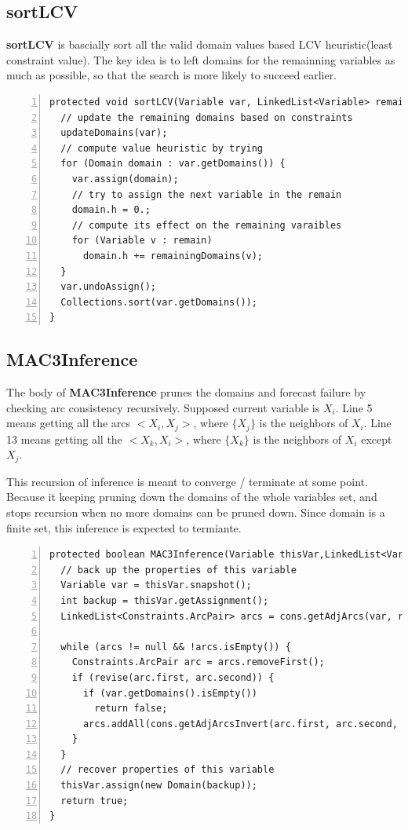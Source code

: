 \documentclass{article}
\begin{document}
\subsection{sortLCV}

\textbf{sortLCV} is bascially sort all the valid domain values based LCV heuristic(least constraint value). The key idea is to left domains for the remainning variables as much as possible, so that the search is more likely to succeed earlier.

\begin{lstlisting}[numbers=left]   
protected void sortLCV(Variable var, LinkedList<Variable> remain) {
  // update the remaining domains based on constraints
  updateDomains(var);
  // compute value heuristic by trying
  for (Domain domain : var.getDomains()) {
    var.assign(domain);
    // try to assign the next variable in the remain
    domain.h = 0.;
    // compute its effect on the remaining varaibles
    for (Variable v : remain)
      domain.h += remainingDomains(v);
  }
  var.undoAssign();
  Collections.sort(var.getDomains());
}
\end{lstlisting}









\clearpage
\subsection{MAC3Inference}

The body of \textbf{MAC3Inference} prunes the domains and forecast failure by checking arc consistency recursively. Supposed current variable is $X_i$. Line 5 means getting all the arcs $<X_i, X_j>$, where $\{X_j\}$ is the neighbors of $X_i$. Line 13 means getting all the $<X_k, X_i>$, where $\{X_k\}$ is the neighbors of $X_i$ except $X_j$.

This recursion of inference is meant to converge / terminate at some point.  Because it keeping pruning down the domains of the whole variables set, and stops recursion when no more domains can be pruned down. Since domain is a finite set, this inference is expected to termiante.

\begin{lstlisting}[numbers=left]   
protected boolean MAC3Inference(Variable thisVar,LinkedList<Variable> remain){
  // back up the properties of this variable
  Variable var = thisVar.snapshot();
  int backup = thisVar.getAssignment();
  LinkedList<Constraints.ArcPair> arcs = cons.getAdjArcs(var, remain);

  while (arcs != null && !arcs.isEmpty()) {
    Constraints.ArcPair arc = arcs.removeFirst();
    if (revise(arc.first, arc.second)) {
      if (var.getDomains().isEmpty())
        return false;
      arcs.addAll(cons.getAdjArcsInvert(arc.first, arc.second, remain));
    }
  }
  // recover properties of this variable
  thisVar.assign(new Domain(backup));
  return true;
}
\end{lstlisting}
\end{document}
